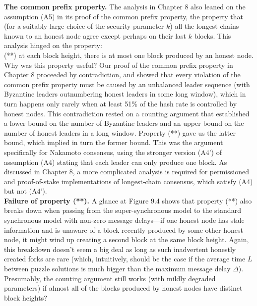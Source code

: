 \noindent
\textbf{The common prefix property.} The analysis in Chapter 8 also leaned on the assumption (A5)
in its proof of the common prefix property, the property that (for a suitably large choice
of the security parameter $k$) all the longest chains known to an honest node agree except
perhaps on their last $k$ blocks. This analysis hinged on the property:\\

(**) at each block height, there is at most one block produced by an honest node.\\

Why was this property useful? Our proof of the common prefix property in Chapter 8
proceeded by contradiction, and showed that every violation of the common prefix property
must be caused by an unbalanced leader sequence (with Byzantine leaders outnumbering
honest leaders in some long window), which in turn happens only rarely when at least 51\%
of the hash rate is controlled by honest nodes. This contradiction rested on a counting
argument that established a lower bound on the number of Byzantine leaders and an upper
bound on the number of honest leaders in a long window. Property (**) gave us the latter
bound, which implied in turn the former bound. This was the argument specifically for Nakamoto consensus, using the stronger version (A4’) of assumption (A4) stating that each leader can only produce one block. As discussed in Chapter 8, a more complicated
analysis is required for permissioned and proof-of-stake implementations of longest-chain consensus, which
satisfy (A4) but not (A4’).\\

\noindent
\textbf{Failure of property (**).} A glance at Figure 9.4 shows that property (**) also
breaks down when passing from the super-synchronous model to the standard synchronous
model with non-zero message delays—if one honest node has stale information and is unaware
of a block recently produced by some other honest node, it might wind up creating a second
block at the same block height. Again, this breakdown doesn't seem a big deal as
long as such inadvertent honestly created forks are rare (which, intuitively, should be the case
if the average time $L$ between puzzle solutions is much bigger than the maximum message
delay $\Delta$). Presumably, the counting argument still works (with mildly degraded parameters)
if almost all of the blocks produced by honest nodes have distinct block heights?\\

